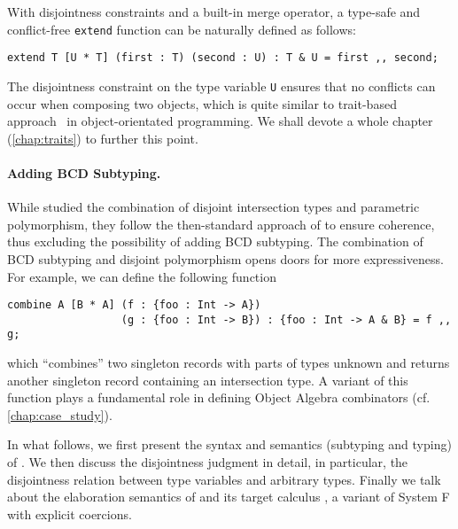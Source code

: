 With disjointness constraints and a built-in merge operator, a type-safe and
conflict-free \lstinline{extend} function can be naturally defined as follows:
\begin{lstlisting}
extend T [U * T] (first : T) (second : U) : T & U = first ,, second;
\end{lstlisting}
The disjointness constraint on the type variable \lstinline{U} ensures that no
conflicts can occur when composing two objects, which is quite similar to
trait-based approach~\citep{scharli2003traits} in object-orientated programming.
We shall devote a whole chapter (\cref{chap:traits}) to further this point.


\paragraph{Adding BCD Subtyping.}

While \citet{alpuimdisjoint} studied the combination of disjoint intersection
types and parametric polymorphism, they follow the then-standard approach
of \citet{oliveira2016disjoint} to ensure coherence, thus excluding the
possibility of adding BCD subtyping. The combination of BCD subtyping and
disjoint polymorphism opens doors for more expressiveness. For example, we can
define the following function
\begin{lstlisting}
combine A [B * A] (f : {foo : Int -> A})
                  (g : {foo : Int -> B}) : {foo : Int -> A & B} = f ,, g;
\end{lstlisting}
which ``combines'' two singleton records with parts of types unknown and returns
another singleton record containing an intersection type. A variant of this
function plays a fundamental role in defining Object Algebra combinators (cf.
\cref{chap:case_study}).




In what follows, we first present the syntax and semantics (subtyping and
typing) of \fnamee. We then discuss the disjointness judgment in detail, in
particular, the disjointness relation between type variables and arbitrary
types. Finally we talk about the elaboration semantics of \fnamee and its target
calculus \tnamee, a variant of System F with explicit coercions.



